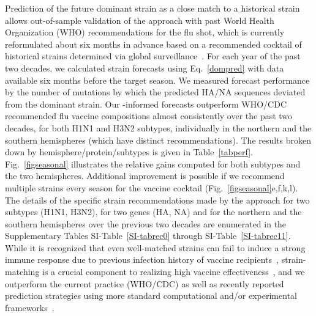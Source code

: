 \documentclass[onecolumn, compsoc,10pt]{IEEEtran}
\begin{document}
Prediction of the future dominant strain as  a close match to a historical strain  allows out-of-sample validation of the approach with past World Health Organization (WHO) recommendations for the flu shot, which  is currently reformulated about six months in advance based on a recommended cocktail of historical strains determined via global surveillance~\cite{agor2018models}. For each year of the past two decades, we calculated strain forecasts using  Eq.~\eqref{dompred} with data available six months before the target season. We  measured forecast performance by the number of mutations by which the predicted HA/NA  sequences deviated from the  dominant strain. Our \enet-informed forecasts outperform  WHO/CDC recommended flu vaccine compositions almost consistently over the past two decades, for both H1N1 and H3N2 subtypes, individually in the northern and the southern hemispheres (which have distinct recommendations). %
%
The  results  broken down by hemisphere/protein/subtypes is given in Table~\ref{tabperf}. Fig.~\ref{figseasonal} illustrates the relative gains computed for both subtypes and the two hemispheres. %
Additional improvement is possible if we recommend multiple strains every season for the vaccine cocktail (Fig.~\ref{figseasonal}e,f,k,l). The details of the specific strain  recommendations made by the \enet approach for two subtypes (H1N1, H3N2), for two genes (HA, NA) and for the northern and the southern hemispheres over the previous two decades are enumerated in the Supplementary Tables SI-Table~\ref{SI-tabrec0} through SI-Table~\ref{SI-tabrec11}. While it is recognized that even well-matched strains can fail to induce a strong immune response due to previous infection history of vaccine recipients~\cite{cobey2018poor}, strain-matching is a crucial component to realizing high vaccine effectiveness~\cite{gouma2020antigenic}, and we  outperform the current practice (WHO/CDC) as well as  recently reported prediction strategies  using more standard computational and/or experimental frameworks~\cite{huddleston2020integrating,neher2014predicting}.
\end{document}
